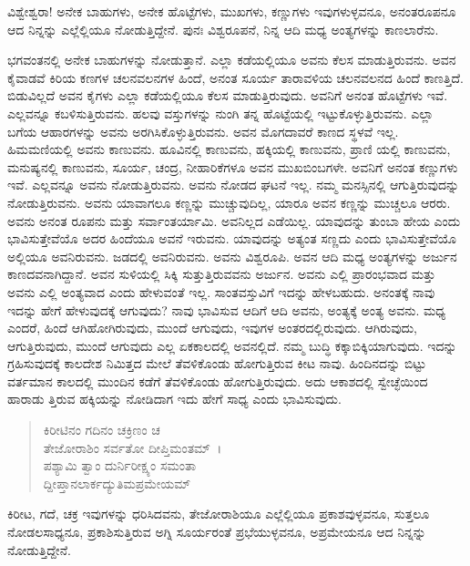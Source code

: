 {\small ವಿಶ್ವೇಶ್ವರಾ! ಅನೇಕ ಬಾಹುಗಳು, ಅನೇಕ ಹೊಟ್ಟೆಗಳು, ಮುಖಗಳು, ಕಣ್ಣುಗಳು ಇವುಗಳುಳ್ಳವನೂ, ಅನಂತರೂಪನೂ ಆದ ನಿನ್ನನ್ನು ಎಲ್ಲೆಲ್ಲಿಯೂ ನೋಡುತ್ತಿದ್ದೇನೆ. ಪುನಃ ವಿಶ್ವರೂಪನೆ, ನಿನ್ನ ಆದಿ ಮಧ್ಯ ಅಂತ್ಯಗಳನ್ನು ಕಾಣಲಾರೆನು.}

ಭಗವಂತನಲ್ಲಿ ಅನೇಕ ಬಾಹುಗಳನ್ನು ನೋಡುತ್ತಾನೆ. ಎಲ್ಲಾ ಕಡೆಯಲ್ಲಿಯೂ ಅವನು ಕೆಲಸ ಮಾಡುತ್ತಿರುವನು. ಅವನ ಕೈವಾಡವೆ ಕಿರಿಯ ಕಣಗಳ ಚಲನವಲನಗಳ ಹಿಂದೆ, ಅನಂತ ಸೂರ್ಯ ತಾರಾವಳಿಯ ಚಲನವಲನದ ಹಿಂದೆ ಕಾಣತ್ತಿದೆ. ಬಿಡುವಿಲ್ಲದೆ ಅವನ ಕೈಗಳು ಎಲ್ಲಾ ಕಡೆಯಲ್ಲಿಯೂ ಕೆಲಸ ಮಾಡುತ್ತಿರುವುದು. ಅವನಿಗೆ ಅನಂತ ಹೊಟ್ಟೆಗಳು ಇವೆ. ಎಲ್ಲವನ್ನೂ ಕಬಳಿಸುತ್ತಿರುವನು. ಹಲವು ವಸ್ತುಗಳನ್ನು ನುಂಗಿ ತನ್ನ ಹೊಟ್ಟೆಯಲ್ಲಿ ಇಟ್ಟುಕೊಳ್ಳುತ್ತಿರುವನು. ಎಲ್ಲಾ ಬಗೆಯ ಆಹಾರಗಳನ್ನು ಅವನು ಅರಗಿಸಿಕೊಳ್ಳುತ್ತಿರುವನು. ಅವನ ಮೊಗದಾವರೆ ಕಾಣದ ಸ್ಥಳವೆ ಇಲ್ಲ. ಹಿಮಮಣಿಯಲ್ಲಿ ಅವನು ಕಾಣುವನು. ಹೂವಿನಲ್ಲಿ ಕಾಣುವನು, ಹಕ್ಕಿಯಲ್ಲಿ ಕಾಣುವನು, ಪ್ರಾಣಿ ಯಲ್ಲಿ ಕಾಣುವನು, ಮನುಷ್ಯನಲ್ಲಿ ಕಾಣುವನು, ಸೂರ್ಯ, ಚಂದ್ರ, ನೀಹಾರಿಕೆಗಳೂ ಅವನ ಮುಖಬಿಂಬಗಳೇ. ಅವನಿಗೆ ಅನಂತ ಕಣ್ಣುಗಳು ಇವೆ. ಎಲ್ಲವನ್ನೂ ಅವನು ನೋಡುತ್ತಿರುವನು. ಅವನು ನೋಡದ ಘಟನೆ ಇಲ್ಲ. ನಮ್ಮ ಮನಸ್ಸಿನಲ್ಲಿ ಆಗುತ್ತಿರುವುದನ್ನು ನೋಡುತ್ತಿರುವನು. ಅವನು ಯಾವಾಗಲೂ ಕಣ್ಣನ್ನು ಮುಚ್ಚುವುದಿಲ್ಲ, ಯಾರೂ ಅವನ ಕಣ್ಣನ್ನು ಮುಚ್ಚಲೂ ಆರರು. ಅವನು ಅನಂತ ರೂಪನು ಮತ್ತು ಸರ್ವಾಂತರ್ಯಾಮಿ. ಅವನಿಲ್ಲದ ಎಡೆಯಿಲ್ಲ. ಯಾವುದನ್ನು ತುಂಬಾ ಹೇಯ ಎಂದು ಭಾವಿಸುತ್ತೇವೆಯೊ ಅದರ ಹಿಂದೆಯೂ ಅವನೆ ಇರುವನು. ಯಾವುದನ್ನು ಅತ್ಯಂತ ಸಣ್ಣದು ಎಂದು ಭಾವಿಸುತ್ತೇವೆಯೊ ಅಲ್ಲಿಯೂ ಅವನಿರುವನು. ಜಡದಲ್ಲಿ ಅವನಿರುವನು. ಅವನು ವಿಶ್ವರೂಪಿ. ಅವನ ಆದಿ ಮಧ್ಯ ಅಂತ್ಯಗಳನ್ನು ಅರ್ಜುನ ಕಾಣದವನಾಗಿದ್ದಾನೆ. ಅವನ ಸುಳಿಯಲ್ಲಿ ಸಿಕ್ಕಿ ಸುತ್ತುತ್ತಿರುವವನು ಅರ್ಜುನ. ಅವನು ಎಲ್ಲಿ ಪ್ರಾರಂಭವಾದ ಮತ್ತು ಅವನು ಎಲ್ಲಿ ಅಂತ್ಯವಾದ ಎಂದು ಹೇಳುವಂತೆ ಇಲ್ಲ. ಸಾಂತವಸ್ತುವಿಗೆ ಇದನ್ನು ಹೇಳಬಹುದು. ಅನಂತಕ್ಕೆ ನಾವು ಇದನ್ನು ಹೇಗೆ ಹೇಳುವುದಕ್ಕೆ ಆಗುವುದು? ನಾವು ಭಾವಿಸುವ ಆದಿಗೆ ಆದಿ ಅವನು, ಅಂತ್ಯಕ್ಕೆ ಅಂತ್ಯ ಅವನು. ಮಧ್ಯ ಎಂದರೆ, ಹಿಂದೆ ಆಗಿಹೋಗಿರುವುದು, ಮುಂದೆ ಆಗುವುದು, ಇವುಗಳ ಅಂತರದಲ್ಲಿರುವುದು. ಆಗಿರುವುದು, ಆಗುತ್ತಿರುವುದು, ಮುಂದೆ ಆಗುವುದು ಎಲ್ಲ ಏಕಕಾಲದಲ್ಲಿ ಅವನಲ್ಲಿದೆ. ನಮ್ಮ ಬುದ್ಧಿ ಕಕ್ಕಾಬಿಕ್ಕಿಯಾಗುವುದು. ಇದನ್ನು ಗ್ರಹಿಸುವುದಕ್ಕೆ ಕಾಲದೇಶ ನಿಮಿತ್ತದ ಮೇಲೆ ತೆವಳಿಕೊಂಡು ಹೋಗುತ್ತಿರುವ ಕೀಟ ನಾವು. ಹಿಂದಿನದನ್ನು ಬಿಟ್ಟು ವರ್ತಮಾನ ಕಾಲದಲ್ಲಿ ಮುಂದಿನ ಕಡೆಗೆ ತೆವಳಿಕೊಂಡು ಹೋಗುತ್ತಿರುವುದು. ಅದು ಆಕಾಶದಲ್ಲಿ ಸ್ವೇಚ್ಛೆಯಿಂದ ಹಾರಾಡು ತ್ತಿರುವ ಹಕ್ಕಿಯನ್ನು ನೋಡಿದಾಗ ಇದು ಹೇಗೆ ಸಾಧ್ಯ ಎಂದು ಭಾವಿಸುವುದು.

\begin{verse}
ಕಿರೀಟಿನಂ ಗದಿನಂ ಚಕ್ರಿಣಂ ಚ\\ ತೇಜೋರಾಶಿಂ ಸರ್ವತೋ ದೀಪ್ತಿಮಂತಮ್~।\\ಪಶ್ಯಾಮಿ ತ್ವಾಂ ದುರ್ನಿರೀಕ್ಷ್ಯಂ ಸಮಂತಾ\\ ದ್ದೀಪ್ತಾನಲಾರ್ಕದ್ಯುತಿಮಪ್ರಮೇಯಮ್ 
\end{verse}

{\small ಕಿರೀಟ, ಗದೆ, ಚಕ್ರ ಇವುಗಳನ್ನು ಧರಿಸಿದವನು, ತೇಜೋರಾಶಿಯೂ ಎಲ್ಲೆಲ್ಲಿಯೂ ಪ್ರಕಾಶವುಳ್ಳವನೂ, ಸುತ್ತಲೂ ನೋಡಲಸಾಧ್ಯನೂ, ಪ್ರಕಾಶಿಸುತ್ತಿರುವ ಅಗ್ನಿ ಸೂರ್ಯರಂತೆ ಪ್ರಭೆಯುಳ್ಳವನೂ, ಅಪ್ರಮೇಯನೂ ಆದ ನಿನ್ನನ್ನು ನೋಡುತ್ತಿದ್ದೇನೆ.}

